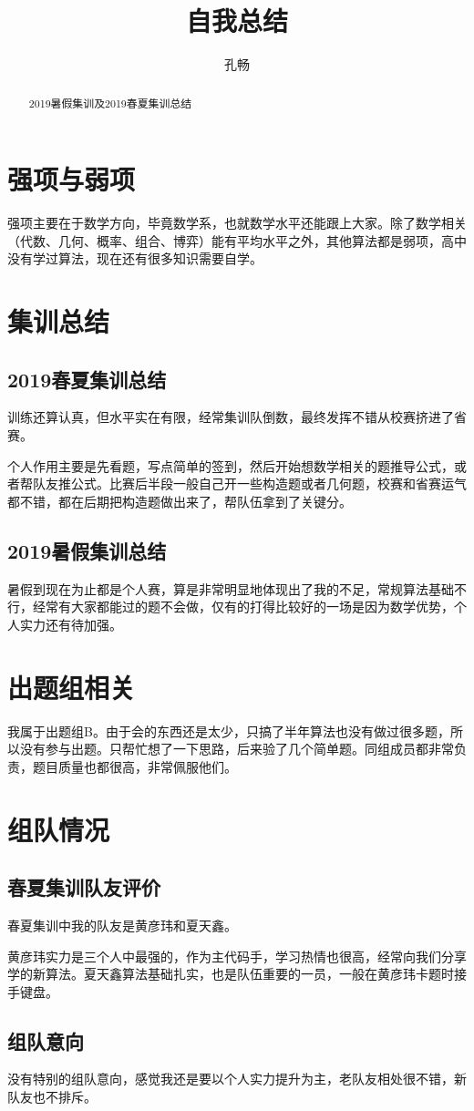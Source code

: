 \documentclass[UTF8]{ctexart}
\begin{document}
\pagestyle{headings}
\title{自我总结}
\author{孔畅
}
\maketitle
\begin{abstract}
2019暑假集训及2019春夏集训总结
\end{abstract}

\section{强项与弱项}

强项主要在于数学方向，毕竟数学系，也就数学水平还能跟上大家。除了数学相关（代数、几何、概率、组合、博弈）能有平均水平之外，其他算法都是弱项，高中没有学过算法，现在还有很多知识需要自学。

\section{集训总结}

\subsection{2019春夏集训总结}

训练还算认真，但水平实在有限，经常集训队倒数，最终发挥不错从校赛挤进了省赛。

个人作用主要是先看题，写点简单的签到，然后开始想数学相关的题推导公式，或者帮队友推公式。比赛后半段一般自己开一些构造题或者几何题，校赛和省赛运气都不错，都在后期把构造题做出来了，帮队伍拿到了关键分。

\subsection{2019暑假集训总结}

暑假到现在为止都是个人赛，算是非常明显地体现出了我的不足，常规算法基础不行，经常有大家都能过的题不会做，仅有的打得比较好的一场是因为数学优势，个人实力还有待加强。

\section{出题组相关}

我属于出题组B。由于会的东西还是太少，只搞了半年算法也没有做过很多题，所以没有参与出题。只帮忙想了一下思路，后来验了几个简单题。同组成员都非常负责，题目质量也都很高，非常佩服他们。

\section{组队情况}

\subsection{春夏集训队友评价}

春夏集训中我的队友是黄彦玮和夏天鑫。

黄彦玮实力是三个人中最强的，作为主代码手，学习热情也很高，经常向我们分享学的新算法。夏天鑫算法基础扎实，也是队伍重要的一员，一般在黄彦玮卡题时接手键盘。

\subsection{组队意向}

没有特别的组队意向，感觉我还是要以个人实力提升为主，老队友相处很不错，新队友也不排斥。
\end{document}
